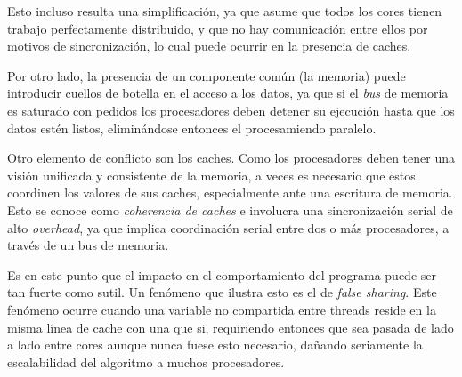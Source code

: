 Esto incluso resulta una simplificaci\'on, ya que asume que todos los cores tienen trabajo perfectamente distribuido, y que
no hay comunicaci\'on entre ellos por motivos de sincronizaci\'on, lo cual puede ocurrir en la presencia de caches.

Por otro lado, la presencia de un componente com\'un (la memoria) puede introducir cuellos de botella en el acceso a los
datos, ya que si el \textit{bus} de memoria es saturado con pedidos los procesadores deben detener su ejecuci\'on hasta que
los datos est\'en listos, elimin\'andose entonces el procesamiendo paralelo.

Otro elemento de conflicto son los caches. Como los procesadores deben tener una visi\'on unificada y consistente de la
memoria, a veces es necesario que estos coordinen los valores de sus caches, especialmente ante una escritura de memoria.
Esto se conoce como \textit{coherencia de caches} e involucra una sincronizaci\'on serial de alto \textit{overhead}, ya
que implica coordinaci\'on serial entre dos o m\'as procesadores, a trav\'es de un bus de memoria. 

Es en este punto que el impacto en el comportamiento del programa puede ser tan fuerte como sutil. Un fen\'omeno que
ilustra esto es el de \textit{false sharing}. Este fen\'omeno ocurre cuando una variable no compartida entre threads
reside en la misma l\'inea de cache con una que si, requiriendo entonces que sea pasada de lado a lado entre cores aunque
nunca fuese esto necesario, da\~nando seriamente la escalabilidad del algoritmo a muchos procesadores.
